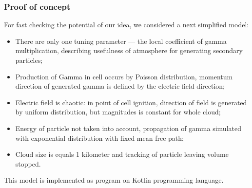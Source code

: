 \documentclass[8pt,pdf,hyperref={unicode}]{beamer}
\begin{document}
\begin{frame}
    \frametitle{Proof of concept}
   	For fast checking the potential of our idea, we considered a next simplified model:  
    \begin{itemize}
    	\item There are only one tuning parameter  --- the local coefficient of gamma multiplication, describing usefulness of atmosphere for generating secondary particles;
    	\item Production of Gamma in cell occurs by Poisson distribution, momentum direction of generated gamma is defined by the electric field direction;
    	\item Electric field is chaotic: in point of cell ignition, direction of field is generated by uniform distribution, but magnitudes is constant for whole cloud;
    	\item Energy of particle not taken into account, propagation of gamma simulated with exponential distribution with fixed mean free path;
    	\item Cloud size is equals 1 kilometer and tracking of particle leaving volume stopped. 
    \end{itemize}
    This model is implemented as program on Kotlin programming language.
    
    
\end{frame}
\end{document}
